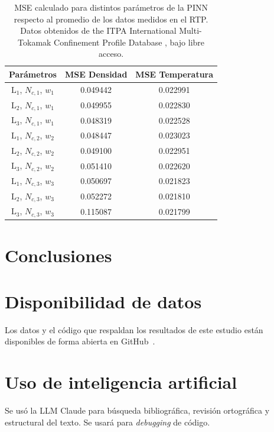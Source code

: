 \begin{table}[]
\caption{MSE calculado para distintos parámetros de la PINN respecto al promedio de los datos medidos en el RTP. Datos obtenidos de the ITPA International Multi-Tokamak Confinement Profile Database \cite{roach2008}, bajo libre acceso.}
\label{tab:mse}
\begin{tabular}{ccc}
\hline
\multicolumn{1}{l}{Parámetros} & \multicolumn{1}{l}{MSE Densidad} & \multicolumn{1}{l}{MSE Temperatura} \\ \hline
$\text{L}_1$, $N_{c,1}$, $w_1$ & 0.049442 & 0.022991 \\
$\text{L}_2$, $N_{c,1}$, $w_1$ & 0.049955 & 0.022830 \\
$\text{L}_3$, $N_{c,1}$, $w_1$ & 0.048319 & 0.022528 \\
$\text{L}_1$, $N_{c,2}$, $w_2$ & 0.048447 & 0.023023 \\
$\text{L}_2$, $N_{c,2}$, $w_2$ & 0.049100 & 0.022951 \\
$\text{L}_3$, $N_{c,2}$, $w_2$ & 0.051410 & 0.022620 \\
$\text{L}_1$, $N_{c,3}$, $w_3$ & 0.050697 & 0.021823 \\
$\text{L}_2$, $N_{c,3}$, $w_3$ & 0.052272 & 0.021810 \\
$\text{L}_3$, $N_{c,3}$, $w_3$ & 0.115087 & 0.021799 \\ \hline
\end{tabular}
\end{table}

\section{Conclusiones}

\section{Disponibilidad de datos}

Los datos y el código que respaldan los resultados de este estudio están disponibles de forma abierta en GitHub~\cite{pinn2026}.

\section{Uso de inteligencia artificial}

Se usó la LLM Claude para búsqueda bibliográfica, revisión ortográfica y estructural del texto. Se usará para \textit{debugging} de código.

